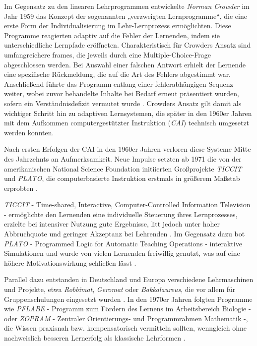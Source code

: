 Im Gegensatz zu den linearen Lehrprogrammen entwickelte \textit{Norman Crowder} im Jahr 1959 das Konzept der sogenannten „verzweigten Lernprogramme“, die eine erste Form der Individualisierung im Lehr-Lernprozess ermöglichten. Diese Programme reagierten adaptiv auf die Fehler der Lernenden, indem sie unterschiedliche Lernpfade eröffneten. Charakteristisch für Crowders Ansatz sind umfangreichere frames, die jeweils durch eine Multiple-Choice-Frage abgeschlossen werden. Bei Auswahl einer falschen Antwort erhielt der Lernende eine spezifische Rückmeldung, die auf die Art des Fehlers abgestimmt war. Anschließend führte das Programm entlang einer fehlerabhängigen Sequenz weiter, wobei zuvor behandelte Inhalte bei Bedarf erneut präsentiert wurden, sofern ein Verständnisdefizit vermutet wurde \parencites[S.~252ff]{crowder_differences_1963}[S.~9]{schonfeld_computerbasiertes_2006}. Crowders Ansatz gilt damit als wichtiger Schritt hin zu adaptiven Lernsystemen, die später in den 1960er Jahren mit dem Aufkommen computergestützter Instruktion (\textit{\ac{CAI}}) technisch umgesetzt werden konnten.
\fi

Nach ersten Erfolgen der \ac{CAI} in den 1960er Jahren verloren diese Systeme Mitte des Jahrzehnts an Aufmerksamkeit. Neue Impulse setzten ab 1971 die von der amerikanischen National Science Foundation initiierten Großprojekte \textit{TICCIT} und \textit{PLATO}, die computerbasierte Instruktion erstmals in größerem Maßstab erprobten \parencites[S.~7]{niegemann_kompendium_2008}[S.~69ff]{oshea_lernen_1986}. 

\textit{TICCIT} - Time-shared, Interactive, Computer-Controlled Information Television -  ermöglichte den Lernenden eine individuelle Steuerung ihres Lernprozesses, erzielte bei intensiver Nutzung gute Ergebnisse, litt jedoch unter hoher Abbruchquote und geringer Akzeptanz bei Lehrenden \parencites[S.~71]{oshea_lernen_1986}[S.~13]{schonfeld_computerbasiertes_2006}. Im Gegensatz dazu bot \textit{PLATO} - Programmed Logic for Automatic Teaching Operations - interaktive Simulationen und wurde von vielen Lernenden freiwillig genutzt, was auf eine höhere Motivationswirkung schließen lässt \parencites[S.~75f]{oshea_lernen_1986}[S.~14]{schonfeld_computerbasiertes_2006}. 

Parallel dazu entstanden in Deutschland und Europa verschiedene Lehrmaschinen und Projekte, etwa \textit{Robbimat}, \textit{Geromat} oder \textit{Bakkalaureus}, die vor allem für Gruppenschulungen eingesetzt wurden \parencite[S.~10]{niegemann_kompendium_2008}. In den 1970er Jahren folgten Programme wie \textit{PFLABE} - Programm zum Fördern des Lernens im Arbeitsbereich Biologie - oder \textit{ZOPRAM} - Zentraler Orientierungs- und Programmrahmen Mathematik -, die Wissen praxisnah bzw. kompensatorisch vermitteln sollten, wenngleich ohne nachweislich besseren Lernerfolg als klassische Lehrformen \parencite[S.~11]{niegemann_kompendium_2008}. 

